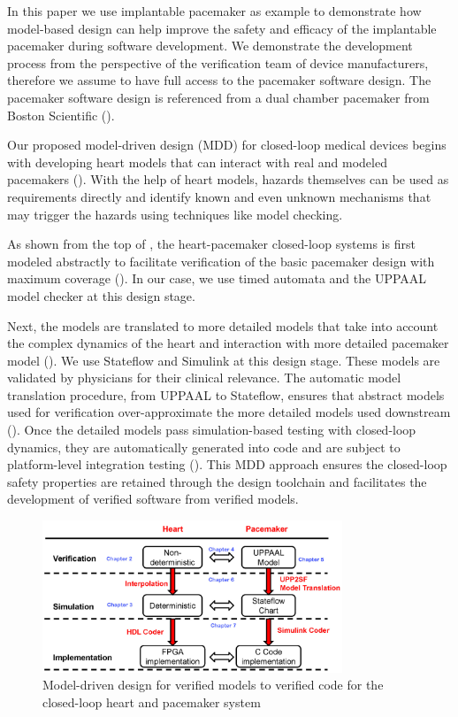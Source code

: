 In this paper we use implantable pacemaker as example to demonstrate how model-based design can help improve the safety and efficacy of the implantable pacemaker during software development. We demonstrate the development process from the perspective of the verification team of device manufacturers, therefore we assume to have full access to the pacemaker software design. The pacemaker software design is referenced from a dual chamber pacemaker from Boston Scientific (\cite{compass}).

Our proposed model-driven design (MDD) for closed-loop medical devices begins with developing heart models that can interact with real and modeled pacemakers (\cite{VHM_proc}). With the help of heart models, hazards themselves can be used as requirements directly and identify known and even unknown mechanisms that may trigger the hazards using techniques like model checking.

As shown from the top of , the heart-pacemaker closed-loop systems is first modeled abstractly to facilitate verification of the basic pacemaker design with maximum coverage (\cite{STTT13}). In our case, we use timed automata and the UPPAAL model checker at this design stage.

Next, the models are translated to more detailed models that take into account the complex dynamics of the heart and interaction with more detailed pacemaker model (\cite{vhm_ecrts10, vhm_embc11,vhm_iccps11}). We use Stateflow and Simulink at this design stage. These models are validated by physicians for their clinical relevance. The automatic model translation procedure, from UPPAAL to Stateflow, ensures that abstract models used for verification over-approximate the more detailed models used downstream (\cite{RTAS12}). Once the detailed models pass simulation-based testing with closed-loop dynamics, they are automatically generated into code and are subject to platform-level integration testing (\cite{vhm_website}). This MDD approach ensures the closed-loop safety properties are retained through the design toolchain and facilitates the development of verified software from verified models.
\begin{figure}[t]
		\centering
		\includegraphics[width=0.8\textwidth]{figs/modeling_overview.jpg}
		\caption{\small Model-driven design for verified models to verified code for the closed-loop heart and pacemaker system}
		\label{fig:modeling_overview}
\end{figure}


